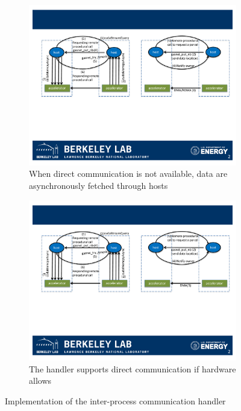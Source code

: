 \begin{figure}[htb]
\begin{subfigure}{0.4\textwidth}
\centering
\includegraphics[width=\textwidth]{figures/handler.pdf}
\caption{When direct communication is not available, data are asynchronously fetched through hosts}
\label{fig:handler}
\end{subfigure}
\begin{subfigure}{0.4\textwidth}
\centering
\includegraphics[width=\textwidth]{figures/handler_dma.pdf}
\caption{The handler supports direct communication if hardware allows}
\label{fig:handler_direct}
\end{subfigure}
\caption{Implementation of the inter-process communication handler}
\end{figure}

